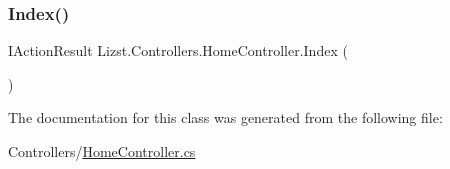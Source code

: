 \mbox{\label{class_lizst_1_1_controllers_1_1_home_controller_a64de64eef3e653369946962eb4f358b3}} 
\subsubsection{\texorpdfstring{Index()}{Index()}}
{\footnotesize\ttfamily I\+Action\+Result Lizst.\+Controllers.\+Home\+Controller.\+Index (\begin{DoxyParamCaption}{ }\end{DoxyParamCaption})}



The documentation for this class was generated from the following file\+:\begin{DoxyCompactItemize}
\item 
Controllers/\mbox{\hyperlink{_home_controller_8cs}{Home\+Controller.\+cs}}\end{DoxyCompactItemize}
